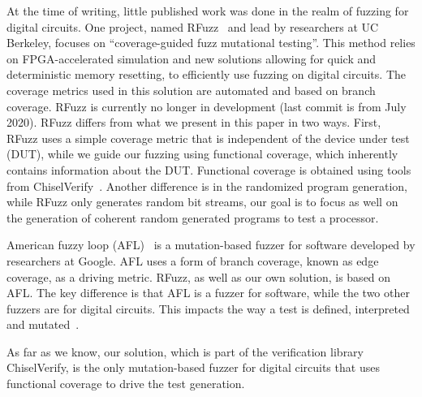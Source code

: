 \documentclass[conference]{IEEEtran}
\newcommand{\rewrite}[1]{{\color{red} rewrite: #1}}
\begin{document}
At the time of writing, little published work was done in the realm of fuzzing for digital circuits.
One project, named RFuzz~\cite{rfuzz2018} and lead by researchers at UC Berkeley, focuses on ``coverage-guided fuzz mutational testing''. This method relies on FPGA-accelerated simulation and new solutions allowing for quick and deterministic memory resetting, to efficiently use fuzzing on digital circuits. The coverage metrics used in this solution are automated and based on branch coverage. RFuzz is currently no longer in development (last commit is from July 2020). RFuzz differs from what we present in this paper in two ways. First, RFuzz uses a simple coverage metric that is independent of the device under test (DUT), while we guide our fuzzing using functional coverage, which inherently contains information about the DUT. Functional coverage is obtained using tools from ChiselVerify~\cite{verify:chisel:2020, dobis2021opensource}.
Another difference is in the randomized program generation, while RFuzz only generates random bit streams, our goal is to focus as well on the generation of coherent random generated programs to test a processor.

American fuzzy loop (AFL)~\cite{afl:repo} is a mutation-based fuzzer for software developed by researchers at Google. 
AFL uses a form of branch coverage, known as edge coverage, as a driving metric.
RFuzz, as well as our own solution, is based on AFL. 
The key difference is that AFL is a fuzzer for software, while the two other fuzzers are for digital circuits.
This impacts the way a test is defined, interpreted and mutated~\cite{rfuzz2018}.

As far as we know, our solution, which is part of the verification library ChiselVerify, is the only mutation-based fuzzer for digital circuits that uses functional coverage to drive the test generation.

\end{document}

